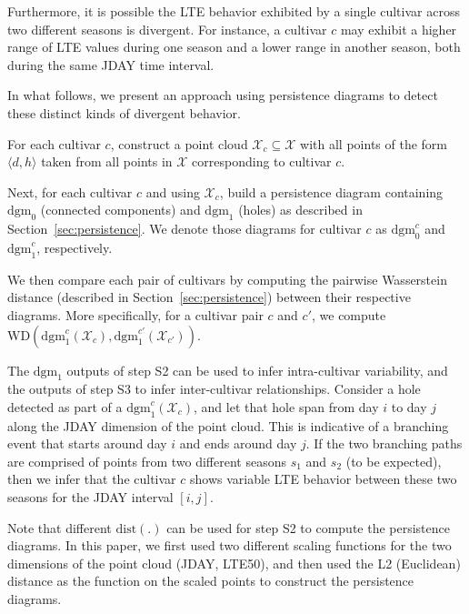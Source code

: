 Furthermore, it is  possible the LTE behavior exhibited by a single cultivar across two different seasons is divergent. For instance, a cultivar $c$ may exhibit a higher range of LTE values during one season and a lower range in another season, both during the same JDAY time interval. 

In what follows, we present an approach using persistence diagrams to detect these distinct kinds of divergent behavior.  

\begin{compactenum}[S1)]
\item 
For each cultivar $c$, construct a point cloud $\mathcal{X}_c\subseteq \mathcal{X}$ with all points of the form $\langle d,h \rangle$ taken from all points in $\mathcal{X}$ corresponding to cultivar $c$.
\item
Next, for each cultivar $c$ and using $\mathcal{X}_c$, build a persistence diagram containing $\mathrm{dgm}_0$ (connected components) and $\mathrm{dgm}_1$ (holes) as described in Section~\ref{sec:persistence}. We denote those diagrams for cultivar $c$ as $\mathrm{dgm}_0^c$ and $\mathrm{dgm}_1^c$, respectively.
\item 
We then compare each pair of cultivars by computing the pairwise Wasserstein distance (described in Section~\ref{sec:persistence}) between their respective diagrams.
More specifically, for a cultivar pair $c$ and $c'$, we compute 
$\mathrm{WD}(\mathrm{dgm}_1^{c}(\mathcal{X}_{c}),\mathrm{dgm}_1^{c'}(\mathcal{X}_{c'}))$.
\end{compactenum}

The $\mathrm{dgm}_1$ outputs of step S2 can be used to infer intra-cultivar variability, and the outputs of step S3 to infer inter-cultivar relationships.
Consider a hole detected as part of a $\mathrm{dgm}_1^c(\mathcal{X}_c)$, and let that hole span from day $i$ to day $j$ along the JDAY dimension of the point cloud.
This is indicative of a branching event that starts around day $i$ and ends around day $j$. If the two branching paths are comprised of points from two different seasons $s_1$ and $s_2$ (to be expected), then we infer that the cultivar $c$ shows variable LTE behavior between these two seasons for the JDAY interval $[i,j]$.

Note that different $\mathrm{dist}(.)$ can be used for step S2 to compute the persistence diagrams.
In this paper, we first used two different scaling functions for the two dimensions of the point cloud (JDAY, LTE50), and then used the L2 (Euclidean) distance as the function on the scaled points to construct the persistence diagrams.

